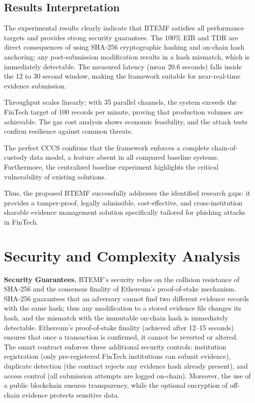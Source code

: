 \documentclass[conference]{IEEEtran}
\begin{document}
\subsection{Results Interpretation}

The experimental results clearly indicate that BTEMF satisfies all performance targets and provides strong security guarantees. The 100\% EIR and TDR are direct consequences of using SHA-256 cryptographic hashing and on-chain hash anchoring; any post-submission modification results in a hash mismatch, which is immediately detectable. The measured latency (mean 20.6 seconds) falls inside the 12 to 30 second window, making the framework suitable for near-real-time evidence submission.

Throughput scales linearly; with 35 parallel channels, the system exceeds the FinTech target of 100 records per minute, proving that production volumes are achievable. The gas cost analysis shows economic feasibility, and the attack tests confirm resilience against common threats.

The perfect CCCS confirms that the framework enforces a complete chain-of-custody data model, a feature absent in all compared baseline systems. Furthermore, the centralized baseline experiment highlights the critical vulnerability of existing solutions.

Thus, the proposed BTEMF successfully addresses the identified research gaps: it provides a tamper-proof, legally admissible, cost-effective, and cross-institution sharable evidence management solution specifically tailored for phishing attacks in FinTech.

\section{Security and Complexity Analysis}

\textbf{Security Guarantees.} BTEMF's security relies on the collision resistance of SHA-256 and the consensus finality of Ethereum's proof-of-stake mechanism. SHA-256 guarantees that an adversary cannot find two different evidence records with the same hash; thus any modification to a stored evidence file changes its hash, and the mismatch with the immutable on-chain hash is immediately detectable. Ethereum's proof-of-stake finality (achieved after 12–15 seconds) ensures that once a transaction is confirmed, it cannot be reverted or altered. The smart contract enforces three additional security controls: institution registration (only pre-registered FinTech institutions can submit evidence), duplicate detection (the contract rejects any evidence hash already present), and access control (all submission attempts are logged on-chain). Moreover, the use of a public blockchain ensures transparency, while the optional encryption of off-chain evidence protects sensitive data.
\end{document}
